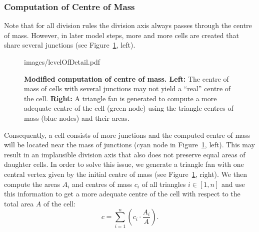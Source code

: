 \documentclass[11pt,a4paper, final]{article}
\begin{document}
\subsubsection{Computation of Centre of Mass}
\noindent
Note that for all division rules the division axis always passes through the centre of mass. However, in later model steps, more and more cells are created that share several junctions (see Figure~\ref{fig:levelOfDetail}, left).
%
\begin{figure}[htbp]
	\begin{center}
		\begin{overpic}[width=1.\linewidth]{images/levelOfDetail.pdf}
		\end{overpic}
\caption[]
{
{\bf Modified computation of centre of mass. Left:} The centre of mass of cells with several junctions may not yield a ``real'' centre of the cell. \textbf{Right:} A triangle fan is generated to compute a more adequate centre of the cell (green node) using the triangle centres of mass (blue nodes) and their areas.
}
	\label{fig:levelOfDetail}
	\end{center}
\end{figure}
%
Consequently, a cell consists of more junctions and the computed centre of mass will be located near the mass of junctions (cyan node in Figure~\ref{fig:levelOfDetail}, left). This may result in an implausible division axis that also does not preserve equal areas of daughter cells. In order to solve this issue, we generate a triangle fan with one central vertex given by the initial centre of mass (see Figure~\ref{fig:levelOfDetail}, right). We then compute the areas $A_i$ and centres of mass $c_i$ of all triangles $i \in [1,n]$ and use this information to get a more adequate centre of the cell with respect to the total area $A$ of the cell:
\begin{equation}
c = \sum_{i=1}^{n} \left( c_i \cdot \frac{A_i}{A} \right).
\end{equation}
\end{document}
